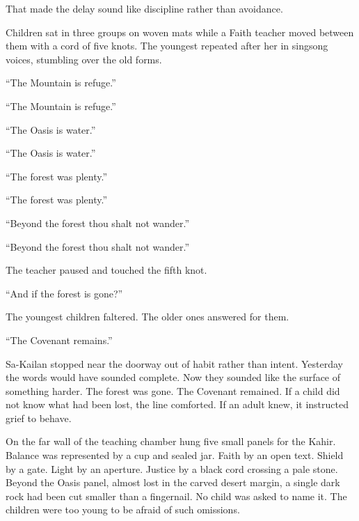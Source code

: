 That made the delay sound like discipline rather than avoidance.\par

Children sat in three groups on woven mats while a Faith teacher moved between them with a cord of five knots.
The youngest repeated after her in singsong voices, stumbling over the old forms.\par

“The Mountain is refuge.”\par

“The Mountain is refuge.”\par

“The Oasis is water.”\par

“The Oasis is water.”\par

“The forest was plenty.”\par

“The forest was plenty.”\par

“Beyond the forest thou shalt not wander.”\par

“Beyond the forest thou shalt not wander.”\par

The teacher paused and touched the fifth knot.\par

“And if the forest is gone?”\par

The youngest children faltered.
The older ones answered for them.\par

“The Covenant remains.”\par

Sa-Kailan stopped near the doorway out of habit rather than intent.
Yesterday the words would have sounded complete.
Now they sounded like the surface of something harder.
The forest was gone.
The Covenant remained.
If a child did not know what had been lost, the line comforted.
If an adult knew, it instructed grief to behave.\par

On the far wall of the teaching chamber hung five small panels for the Kahir.
Balance was represented by a cup and sealed jar.
Faith by an open text.
Shield by a gate.
Light by an aperture.
Justice by a black cord crossing a pale stone.
Beyond the Oasis panel, almost lost in the carved desert margin, a single dark rock had been cut smaller than a fingernail.
No child was asked to name it.
The children were too young to be afraid of such omissions.\par


